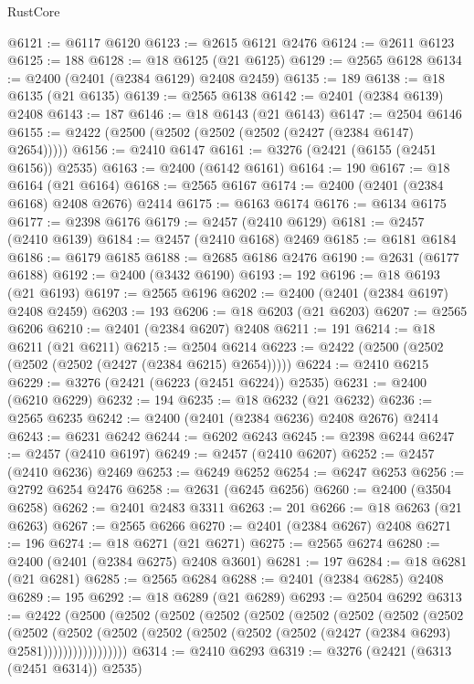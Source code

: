 \begin{lexlean}{RustCore}
\begin{coremodule}
@6121 := @6117 @6120
@6123 := @2615 @6121 @2476
@6124 := @2611 @6123
@6125 := 188
@6128 := @18 @6125 (@21 @6125)
@6129 := @2565 @6128
@6134 := @2400 (@2401 (@2384 @6129) @2408 @2459)
@6135 := 189
@6138 := @18 @6135 (@21 @6135)
@6139 := @2565 @6138
@6142 := @2401 (@2384 @6139) @2408
@6143 := 187
@6146 := @18 @6143 (@21 @6143)
@6147 := @2504 @6146
@6155 := @2422 (@2500 (@2502 (@2502 (@2502 (@2427 (@2384 @6147) @2654)))))
@6156 := @2410 @6147
@6161 := @3276 (@2421 (@6155 (@2451 @6156)) @2535)
@6163 := @2400 (@6142 @6161)
@6164 := 190
@6167 := @18 @6164 (@21 @6164)
@6168 := @2565 @6167
@6174 := @2400 (@2401 (@2384 @6168) @2408 @2676) @2414
@6175 := @6163 @6174
@6176 := @6134 @6175
@6177 := @2398 @6176
@6179 := @2457 (@2410 @6129)
@6181 := @2457 (@2410 @6139)
@6184 := @2457 (@2410 @6168) @2469
@6185 := @6181 @6184
@6186 := @6179 @6185
@6188 := @2685 @6186 @2476
@6190 := @2631 (@6177 @6188)
@6192 := @2400 (@3432 @6190)
@6193 := 192
@6196 := @18 @6193 (@21 @6193)
@6197 := @2565 @6196
@6202 := @2400 (@2401 (@2384 @6197) @2408 @2459)
@6203 := 193
@6206 := @18 @6203 (@21 @6203)
@6207 := @2565 @6206
@6210 := @2401 (@2384 @6207) @2408
@6211 := 191
@6214 := @18 @6211 (@21 @6211)
@6215 := @2504 @6214
@6223 := @2422 (@2500 (@2502 (@2502 (@2502 (@2427 (@2384 @6215) @2654)))))
@6224 := @2410 @6215
@6229 := @3276 (@2421 (@6223 (@2451 @6224)) @2535)
@6231 := @2400 (@6210 @6229)
@6232 := 194
@6235 := @18 @6232 (@21 @6232)
@6236 := @2565 @6235
@6242 := @2400 (@2401 (@2384 @6236) @2408 @2676) @2414
@6243 := @6231 @6242
@6244 := @6202 @6243
@6245 := @2398 @6244
@6247 := @2457 (@2410 @6197)
@6249 := @2457 (@2410 @6207)
@6252 := @2457 (@2410 @6236) @2469
@6253 := @6249 @6252
@6254 := @6247 @6253
@6256 := @2792 @6254 @2476
@6258 := @2631 (@6245 @6256)
@6260 := @2400 (@3504 @6258)
@6262 := @2401 @2483 @3311
@6263 := 201
@6266 := @18 @6263 (@21 @6263)
@6267 := @2565 @6266
@6270 := @2401 (@2384 @6267) @2408
@6271 := 196
@6274 := @18 @6271 (@21 @6271)
@6275 := @2565 @6274
@6280 := @2400 (@2401 (@2384 @6275) @2408 @3601)
@6281 := 197
@6284 := @18 @6281 (@21 @6281)
@6285 := @2565 @6284
@6288 := @2401 (@2384 @6285) @2408
@6289 := 195
@6292 := @18 @6289 (@21 @6289)
@6293 := @2504 @6292
@6313 := @2422
    (@2500
      (@2502
        (@2502
          (@2502
            (@2502
              (@2502
                (@2502
                  (@2502
                    (@2502
                      (@2502
                        (@2502
                          (@2502
                            (@2502 (@2502 (@2502 (@2502 (@2427 (@2384 @6293) @2581)))))))))))))))))
@6314 := @2410 @6293
@6319 := @3276 (@2421 (@6313 (@2451 @6314)) @2535)

\end{coremodule}
\end{lexlean}
